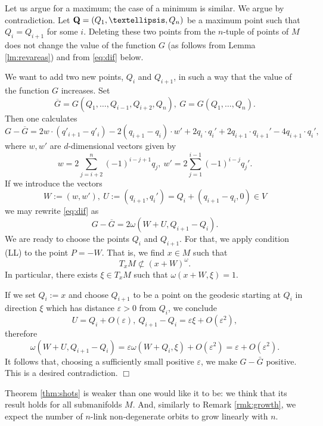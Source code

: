 \documentclass[12pt]{article}
\newcommand{\proofend}{$\Box$\bigskip}
\begin{document}
Let us argue for a maximum; the case of a minimum is similar. We argue by contradiction. Let ${\bf Q}=(Q_1,\ldots,Q_n)$ be a maximum point such that $Q_i=Q_{i+1}$ for some $i$. Deleting these two points from the $n$-tuple of points of $M$ does not change the value of the function $G$ (as follows from Lemma \ref{lm:revareas}) and from \eqref{eq:dif} below.

We want to add two new points, $Q_{i}$ and $Q_{i+1}$, in such a way that the value of the function $G$  increases. Set
$$
\overline G = G(Q_1,\ldots,Q_{i-1},Q_{i+2},Q_n),\ G=G(Q_1,\ldots,Q_{n}).
$$
Then one calculates
\begin{equation} \label{eq:dif}
G - \overline G = 2 w \cdot (q'_{i+1}-q'_{i}) - 2(q_{i+1}-q_i)\cdot w' + 2q_{i}\cdot q_i'+ 2 q_{i+1}\cdot q_{i+1}' - 4 q_{i+1}\cdot q_{i}',
\end{equation}
where $w, w'$ are $d$-dimensional vectors given by
$$
w= 2 \sum_{j=i+2}^{n} (-1)^{i-j+1} q_j, \ w'= 2 \sum_{j=1}^{i-1} (-1)^{i-j} q_j'.
$$
If we introduce the vectors 
$$
W:=(w,w'),\ U:=(q_{i+1},q_{i}')= Q_{i} + (q_{i+1}-q_{i},0)\in V
$$
we may rewrite \eqref{eq:dif} as
$$
G - \overline G = 2\omega(W+U,Q_{i+1}-Q_{i}).
$$
We are ready to choose the points $Q_{i}$ and $Q_{i+1}$. For that, we apply condition (LL) to the point $P=-W$. That is, we 
find $x\in M$ such that 
$$
T_x M \not\subset  (x+W)^\omega.
$$
In particular, there exists $\xi \in T_x M$ such that $\omega(x+W,\xi)=1$. 

If we set $Q_{i}:=x$ and choose $Q_{i+1}$ to be a point on the geodesic starting at $Q_{i}$ in  direction $\xi$ which has distance $\varepsilon > 0$ from $Q_{i}$, 
we conclude
$$
U = Q_{i} + O(\varepsilon),\ Q_{i+1}-Q_{i} = \varepsilon \xi + O(\varepsilon^2),
$$
therefore
$$
\omega(W+U,Q_{i+1}-Q_{i}) = \varepsilon \omega(W+Q_{i},\xi) + O(\varepsilon^2) = \varepsilon + O(\varepsilon^2).
$$
It follows that, choosing a sufficiently small positive $\varepsilon$, we make $G - \bar G$ positive. This is a desired contradiction.
\proofend

Theorem \ref{thm:shots} is weaker than one would like it to be: we think that its result holds for all submanifolds $M$. And, similarly to Remark \ref{rmk:growth}, we expect the number of $n$-link non-degenerate orbits to grow linearly with $n$.
\end{document}
